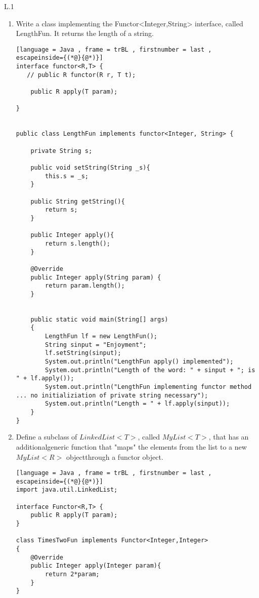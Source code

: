 L.1
\begin{enumerate}[label=(\alph*),align=left, wide, labelwidth=!, labelindent=0pt]

\item Write a class implementing the Functor<Integer,String> interface, called LengthFun.  It returns the length of a string.
\begin{lstlisting}[language = Java , frame = trBL , firstnumber = last , escapeinside={(*@}{@*)}]
interface functor<R,T> {
   // public R functor(R r, T t);    

    public R apply(T param);
    
}


public class LengthFun implements functor<Integer, String> {    

    private String s;
    
    public void setString(String _s){
        this.s = _s;
    }
    
    public String getString(){
        return s;
    }
    
    public Integer apply(){
        return s.length();
    }
    
    @Override
    public Integer apply(String param) {
        return param.length();
    }    
    
    
    public static void main(String[] args)
    {
        LengthFun lf = new LengthFun();
        String sinput = "Enjoyment";
        lf.setString(sinput);
        System.out.println("LengthFun apply() implemented");
        System.out.println("Length of the word: " + sinput + "; is " + lf.apply());
        System.out.println("LengthFun implementing functor method ... no initializiation of private string necessary");
        System.out.println("Length = " + lf.apply(sinput));
    }
}
\end{lstlisting}  		

\item Define a subclass of $LinkedList<T>$, called $MyList<T>$, that has an additionalgeneric function that "maps" the elements from the list to a new $MyList<R>$ objectthrough a functor object.

\begin{lstlisting}[language = Java , frame = trBL , firstnumber = last , escapeinside={(*@}{@*)}]
import java.util.LinkedList;

interface Functor<R,T> {
    public R apply(T param);
}

class TimesTwoFun implements Functor<Integer,Integer>
{
    @Override
    public Integer apply(Integer param){
        return 2*param;
    }
}


\end{lstlisting}
\end{enumerate}
